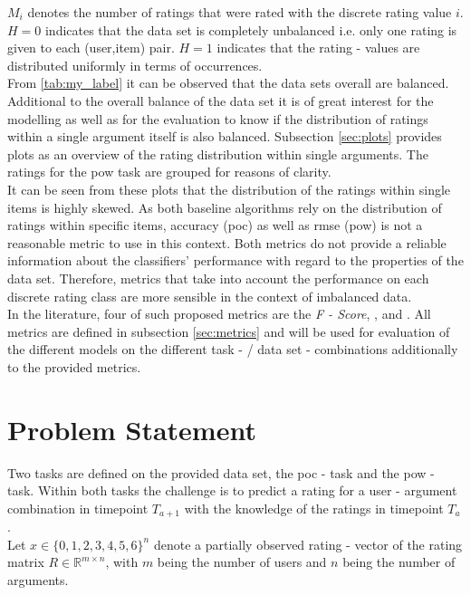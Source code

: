 \noindent $M_i$ denotes the number of ratings that were rated with the discrete rating value $i$.\\
\noindent $H=0$ indicates that the data set is completely unbalanced i.e. only one rating is given to each (user,item) pair. $H=1$ indicates that the rating - values are distributed uniformly in terms of occurrences.\\
From \autoref{tab:my_label} it can be observed that the data sets overall are balanced.  Additional to the overall balance of the data set it is of great interest for the modelling as well as for the evaluation to know if the distribution of ratings within a single argument itself is also balanced. Subsection \ref{sec:plots} provides plots as an overview of the rating distribution within single arguments. The ratings for the \acrshort{pow} task are grouped for reasons of clarity.\\
It can be seen from these plots that the distribution of the ratings within single items is highly skewed. As both baseline algorithms rely on the distribution of ratings within specific items, accuracy (\acrshort{poc}) as well as \acrfull{rmse} (\acrshort{pow}) is not a reasonable metric to use in this context. Both metrics do not provide a reliable information about the classifiers' performance with regard to the properties of the data set. Therefore, metrics that take into account the performance on each discrete rating class are more sensible in the context of imbalanced data.\\
In the literature, four of such proposed metrics are the \textit{F - Score}, ,  and  \cite{he2009learning}. All metrics are defined in subsection \ref{sec:metrics} and will be used for evaluation of the different models on the different task - / data set - combinations additionally to the provided metrics.

\section{Problem Statement}
\label{sec:problem}
Two tasks are defined on the provided data set, the \acrshort{poc} - task and the \acrshort{pow} - task. Within both tasks the challenge is to predict a rating for a user - argument combination in timepoint $T_{a+1}$ with the knowledge of the ratings in timepoint $T_a$.\\ Let $x \in \{0,1,2,3,4,5,6\}^{n}$ denote a partially observed rating - vector of the rating matrix $R \in \mathbb{R}^{m \times n}$, with $m$ being the number of users and $n$ being the number of arguments.
